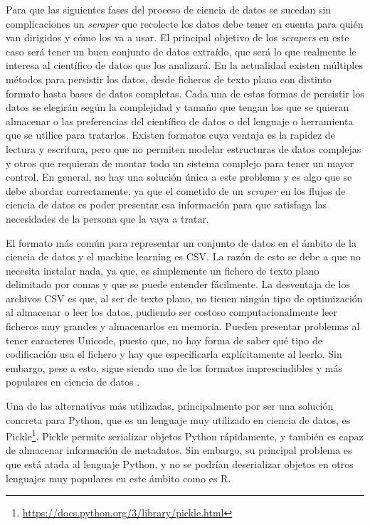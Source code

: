 Para que las siguientes fases del proceso de ciencia de datos se sucedan sin
complicaciones un \textit{scraper} que recolecte los datos debe tener en cuenta
para quién van dirigidos y cómo los va a usar. El principal objetivo de los
\textit{scrapers} en este caso será tener un buen conjunto de datos extraído,
que será lo que realmente le interesa al científico de datos que los analizará.
En la actualidad existen múltiples métodos para persistir los datos, desde
ficheros de texto plano con distinto formato hasta bases de datos completas.
Cada una de estas formas de persistir los datos se elegirán según la complejidad
y tamaño que tengan los que se quieran almacenar o las preferencias del
científico de datos o del lenguaje o herramienta que se utilice para tratarlos.
Existen formatos cuya ventaja es la rapidez de lectura y escritura, pero que no
permiten modelar estructuras de datos complejas y otros que requieran de montar
todo un sistema complejo para tener un mayor control. En general, no hay una
solución única a este problema y es algo que se debe abordar correctamente, ya
que el cometido de un \textit{scraper} en los flujos de ciencia de datos es
poder presentar esa información para que satisfaga las necesidades de la persona
que la vaya a tratar.

El formato más común para representar un conjunto de datos en el ámbito de la
ciencia de datos y el machine learning es CSV. La razón de esto se debe a que no
necesita instalar nada, ya que, es simplemente un fichero de texto plano
delimitado por comas y que se puede entender fácilmente. La desventaja de los
archivos CSV es que, al ser de texto plano, no tienen ningún tipo de
optimización al almacenar o leer los datos, pudiendo ser costoso
computacionalmente leer ficheros muy grandes y almacenarlos en memoria. Pueden
presentar problemas al tener caracteres Unicode, puesto que, no hay forma de
saber qué tipo de codificación usa el fichero y hay que especificarla
explícitamente al leerlo. Sin embargo, pese a esto, sigue siendo uno de los
formatos imprescindibles y más populares en ciencia de datos
\cite{murallie_csvs_2022}.

Una de las alternativas más utilizadas, principalmente por ser una solución
concreta para Python, que es un lenguaje muy utilizado en ciencia de datos, es
Pickle\footnote{\url{https://docs.python.org/3/library/pickle.html}}\cite{murallie_csvs_2022}.
Pickle permite serializar objetos Python rápidamente, y también es capaz de
almacenar información de metadatos. Sin embargo, su principal problema es que
está atada al lenguaje Python, y no se podrían deserializar objetos en otros
lenguajes muy populares en este ámbito como es R. 

